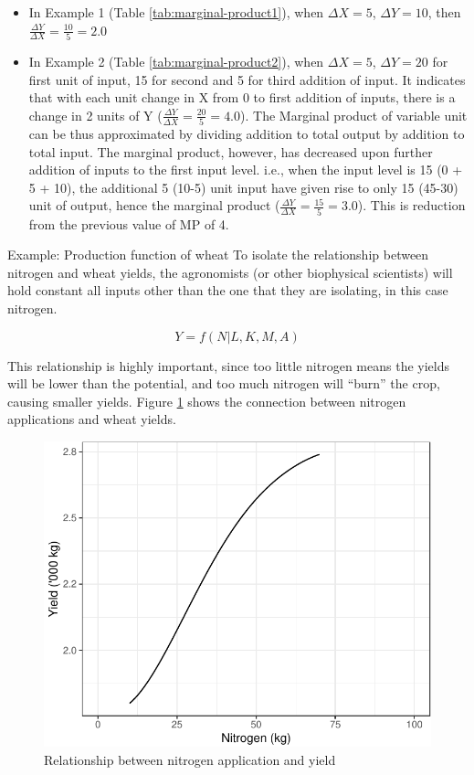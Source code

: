 \documentclass[12pt,ignorenonframetext,aspectratio=169]{beamer}
\providecommand{\tightlist}{%
  \setlength{\itemsep}{0pt}\setlength{\parskip}{0pt}}
\begin{document}
\begin{frame}{}
\protect\hypertarget{section-2}{}
\begin{itemize}
\tightlist
\item
  In Example 1 (Table \ref{tab:marginal-product1}), when
  \(\Delta X = 5\), \(\Delta Y = 10\), then
  \(\frac{\Delta Y}{\Delta X} = \frac{10}{5} = 2.0\)
\item
  In Example 2 (Table \ref{tab:marginal-product2}), when
  \(\Delta X = 5\), \(\Delta Y = 20\) for first unit of input, 15 for
  second and 5 for third addition of input. It indicates that with each
  unit change in X from 0 to first addition of inputs, there is a change
  in 2 units of Y (\(\frac{\Delta Y}{\Delta X} = \frac{20}{5} = 4.0\)).
  The Marginal product of variable unit can be thus approximated by
  dividing addition to total output by addition to total input. The
  marginal product, however, has decreased upon further addition of
  inputs to the first input level. i.e., when the input level is 15 (0 +
  5 + 10), the additional 5 (10-5) unit input have given rise to only 15
  (45-30) unit of output, hence the marginal product
  (\(\frac{\Delta Y}{\Delta X} = \frac{15}{5} = 3.0\)). This is
  reduction from the previous value of MP of 4.
\end{itemize}
\end{frame}

\begin{frame}{Example: Production function of wheat}
\protect\hypertarget{example-production-function-of-wheat}{}
To isolate the relationship between nitrogen and wheat yields, the
agronomists (or other biophysical scientists) will hold constant all
inputs other than the one that they are isolating, in this case
nitrogen.

\[Y = f(N | L, K, M, A)\]

This relationship is highly important, since too little nitrogen means
the yields will be lower than the potential, and too much nitrogen will
``burn'' the crop, causing smaller yields. Figure
\ref{fig:nitrogen-wheat} shows the connection between nitrogen
applications and wheat yields.
\end{frame}

\begin{frame}{}
\protect\hypertarget{section-3}{}
\begin{figure}
\includegraphics[width=0.5\linewidth]{03-production_relationship_files/figure-beamer/nitrogen-wheat-1} \caption{Relationship between nitrogen application and yield}\label{fig:nitrogen-wheat}
\end{figure}
\end{frame}
\end{document}
